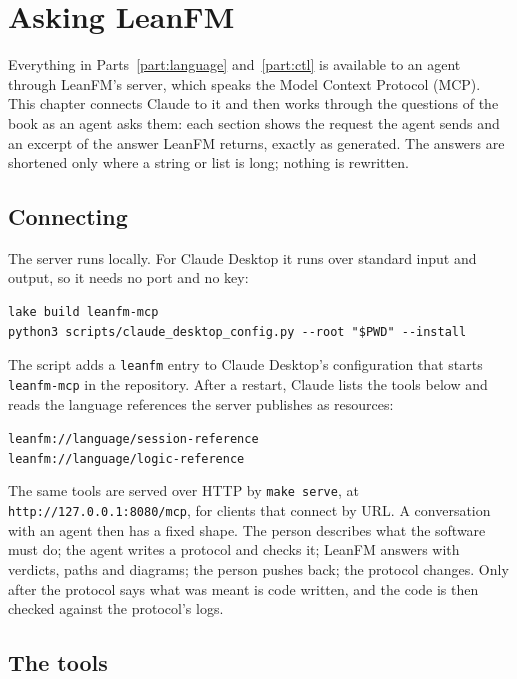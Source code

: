 \chapter{Asking LeanFM}\label{ch:mcp}

Everything in Parts~\ref{part:language} and~\ref{part:ctl} is available to an agent
through LeanFM's server, which speaks the Model Context Protocol (MCP). This chapter
connects Claude to it and then works through the questions of the book as an agent asks
them: each section shows the request the agent sends and an excerpt of the answer
LeanFM returns, exactly as generated. The answers are shortened only where a string or
list is long; nothing is rewritten.

\section{Connecting}

The server runs locally. For Claude Desktop it runs over standard input and output, so
it needs no port and no key:
\begin{lstlisting}[language={},basicstyle=\ttfamily\footnotesize]
lake build leanfm-mcp
python3 scripts/claude_desktop_config.py --root "$PWD" --install
\end{lstlisting}
The script adds a \texttt{leanfm} entry to Claude Desktop's configuration that starts
\texttt{leanfm-mcp} in the repository. After a restart, Claude lists the tools below and
reads the language references the server publishes as resources:
\begin{center}
\texttt{leanfm://language/session-reference}\\
\texttt{leanfm://language/logic-reference}
\end{center}
The same tools are served over HTTP by \texttt{make serve}, at
\texttt{http://127.0.0.1:8080/mcp}, for clients that connect by URL.
A conversation with an agent then has a fixed shape. The person describes what the
software must do; the agent writes a protocol and checks it; LeanFM answers with
verdicts, paths and diagrams; the person pushes back; the protocol changes. Only after
the protocol says what was meant is code written, and the code is then checked against
the protocol's logs.

\section{The tools}


